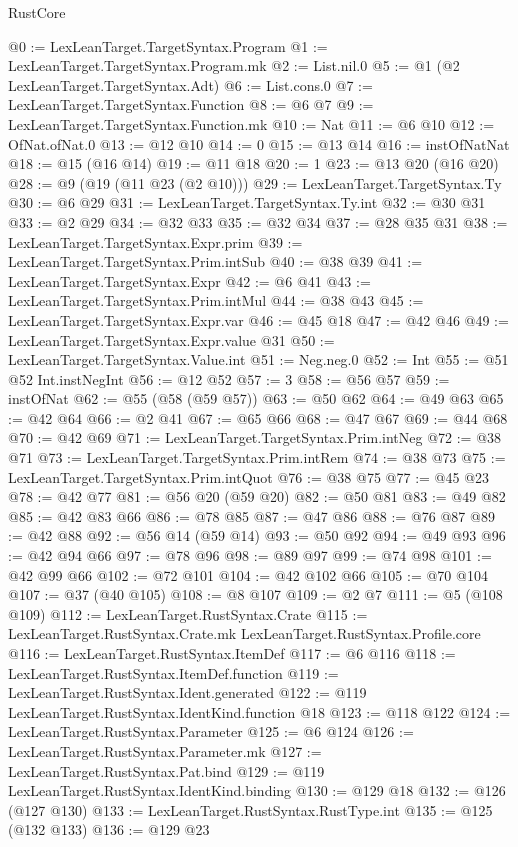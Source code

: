 \begin{lexlean}{RustCore}
\begin{coremodule}
@0 := LexLeanTarget.TargetSyntax.Program
@1 := LexLeanTarget.TargetSyntax.Program.mk
@2 := List.nil.{0}
@5 := @1 (@2 LexLeanTarget.TargetSyntax.Adt)
@6 := List.cons.{0}
@7 := LexLeanTarget.TargetSyntax.Function
@8 := @6 @7
@9 := LexLeanTarget.TargetSyntax.Function.mk
@10 := Nat
@11 := @6 @10
@12 := OfNat.ofNat.{0}
@13 := @12 @10
@14 := 0
@15 := @13 @14
@16 := instOfNatNat
@18 := @15 (@16 @14)
@19 := @11 @18
@20 := 1
@23 := @13 @20 (@16 @20)
@28 := @9 (@19 (@11 @23 (@2 @10)))
@29 := LexLeanTarget.TargetSyntax.Ty
@30 := @6 @29
@31 := LexLeanTarget.TargetSyntax.Ty.int
@32 := @30 @31
@33 := @2 @29
@34 := @32 @33
@35 := @32 @34
@37 := @28 @35 @31
@38 := LexLeanTarget.TargetSyntax.Expr.prim
@39 := LexLeanTarget.TargetSyntax.Prim.intSub
@40 := @38 @39
@41 := LexLeanTarget.TargetSyntax.Expr
@42 := @6 @41
@43 := LexLeanTarget.TargetSyntax.Prim.intMul
@44 := @38 @43
@45 := LexLeanTarget.TargetSyntax.Expr.var
@46 := @45 @18
@47 := @42 @46
@49 := LexLeanTarget.TargetSyntax.Expr.value @31
@50 := LexLeanTarget.TargetSyntax.Value.int
@51 := Neg.neg.{0}
@52 := Int
@55 := @51 @52 Int.instNegInt
@56 := @12 @52
@57 := 3
@58 := @56 @57
@59 := instOfNat
@62 := @55 (@58 (@59 @57))
@63 := @50 @62
@64 := @49 @63
@65 := @42 @64
@66 := @2 @41
@67 := @65 @66
@68 := @47 @67
@69 := @44 @68
@70 := @42 @69
@71 := LexLeanTarget.TargetSyntax.Prim.intNeg
@72 := @38 @71
@73 := LexLeanTarget.TargetSyntax.Prim.intRem
@74 := @38 @73
@75 := LexLeanTarget.TargetSyntax.Prim.intQuot
@76 := @38 @75
@77 := @45 @23
@78 := @42 @77
@81 := @56 @20 (@59 @20)
@82 := @50 @81
@83 := @49 @82
@85 := @42 @83 @66
@86 := @78 @85
@87 := @47 @86
@88 := @76 @87
@89 := @42 @88
@92 := @56 @14 (@59 @14)
@93 := @50 @92
@94 := @49 @93
@96 := @42 @94 @66
@97 := @78 @96
@98 := @89 @97
@99 := @74 @98
@101 := @42 @99 @66
@102 := @72 @101
@104 := @42 @102 @66
@105 := @70 @104
@107 := @37 (@40 @105)
@108 := @8 @107
@109 := @2 @7
@111 := @5 (@108 @109)
@112 := LexLeanTarget.RustSyntax.Crate
@115 := LexLeanTarget.RustSyntax.Crate.mk LexLeanTarget.RustSyntax.Profile.core
@116 := LexLeanTarget.RustSyntax.ItemDef
@117 := @6 @116
@118 := LexLeanTarget.RustSyntax.ItemDef.function
@119 := LexLeanTarget.RustSyntax.Ident.generated
@122 := @119 LexLeanTarget.RustSyntax.IdentKind.function @18
@123 := @118 @122
@124 := LexLeanTarget.RustSyntax.Parameter
@125 := @6 @124
@126 := LexLeanTarget.RustSyntax.Parameter.mk
@127 := LexLeanTarget.RustSyntax.Pat.bind
@129 := @119 LexLeanTarget.RustSyntax.IdentKind.binding
@130 := @129 @18
@132 := @126 (@127 @130)
@133 := LexLeanTarget.RustSyntax.RustType.int
@135 := @125 (@132 @133)
@136 := @129 @23

\end{coremodule}
\end{lexlean}
